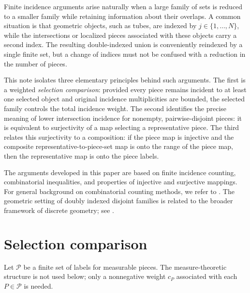 \documentclass[11pt, letterpaper]{nyjm}
\newcommand{\calP}{\mathcal{P}}
\begin{document}
	Finite incidence arguments arise naturally when a large family of sets is
	reduced to a smaller family while retaining information about their
	overlaps. A common situation is that geometric objects, such as tubes,
	are indexed by $j\in\{1,\ldots,N\}$, while the intersections or localized
	pieces associated with these objects carry a second index.  The resulting
	double-indexed union is conveniently reindexed by a single finite set,
	but a change of indices must not be confused with a reduction in the
	number of pieces.
	
	This note isolates three elementary principles behind such arguments.
	The first is a weighted \emph{selection comparison}: provided every
	piece remains incident to at least one selected object and original
	incidence multiplicities are bounded, the selected family controls the
	total incidence weight. The second identifies the precise meaning of
	lower intersection incidence for nonempty, pairwise-disjoint pieces:
	it is equivalent to surjectivity of a map selecting a representative
	piece. The third relates this surjectivity to a composition: if the
	piece map is injective and the composite representative-to-piece-set
	map is onto the range of the piece map, then the representative map is
	onto the piece labels.
	
	The arguments developed in this paper are based on
	finite incidence counting, combinatorial inequalities,
	and properties of injective and surjective mappings.
	For general background on combinatorial counting
	methods, we refer to \cite{vanLintWilson}.
	The geometric setting of doubly indexed disjoint
	families is related to the broader framework of
	discrete geometry; see \cite{Matousek}.
	
	\section{Selection comparison}
	
	Let $\calP$ be a finite set of labels for measurable pieces. The
	measure-theoretic structure is not used below; only a nonnegative weight
	$c_P$ associated with each $P\in\calP$ is needed.
	
\end{document}
